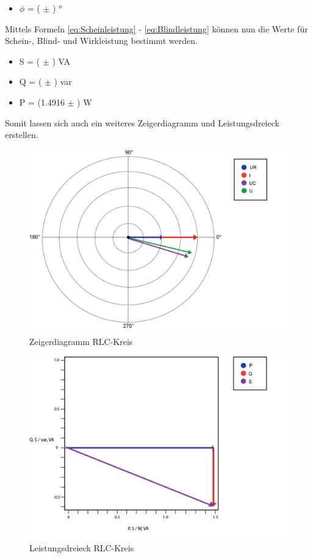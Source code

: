 \documentclass[12pt,a4paper,twoside]{article}
\begin{document}
\begin{itemize}
    \item $\phi$ = ( $\pm$ ) °
\end{itemize}

\noindent
Mittels Formeln \ref{eq:Scheinleistung} - \ref{eq:Blindleistung} können nun die Werte für Schein-, Blind- und Wirkleistung bestimmt werden.

\begin{itemize}
    \item S = ( $\pm$ ) VA
    \item Q = ( $\pm$ ) var
    \item P = (1.4916 $\pm$ ) W
\end{itemize}

\noindent
Somit lassen sich auch ein weiteres Zeigerdiagramm und Leistungsdreieck erstellen.

\begin{figure}[H]
    \centering
    \includegraphics[width=0.6\linewidth]{nudes/Phasendiagramm7.png}
    \caption{Zeigerdiagramm RLC-Kreis}
    \label{fig:ZeigerdiagrammRLC}
\end{figure}

\begin{figure}[H]
    \centering
    \includegraphics[width=0.6\linewidth]{nudes/Leistungsdreieck7.png}
    \caption{Leistungsdreieck RLC-Kreis}
    \label{fig:LeistungsdreieckRLC}
\end{figure}
\end{document}
